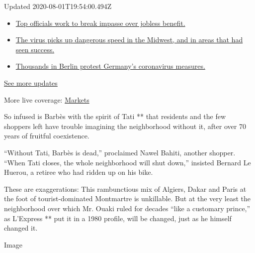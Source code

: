 Updated 2020-08-01T19:54:00.494Z

\begin{itemize}
\tightlist
\item
  \href{https://www.nytimes3xbfgragh.onion/2020/08/01/world/coronavirus-covid-19.html?action=click\&pgtype=Article\&state=default\&region=MAIN_CONTENT_1\&context=storylines_live_updates\#link-3ac56579}{Top
  officials work to break impasse over jobless benefit.}
\item
  \href{https://www.nytimes3xbfgragh.onion/2020/08/01/world/coronavirus-covid-19.html?action=click\&pgtype=Article\&state=default\&region=MAIN_CONTENT_1\&context=storylines_live_updates\#link-8796723}{The
  virus picks up dangerous speed in the Midwest, and in areas that had
  seen success.}
\item
  \href{https://www.nytimes3xbfgragh.onion/2020/08/01/world/coronavirus-covid-19.html?action=click\&pgtype=Article\&state=default\&region=MAIN_CONTENT_1\&context=storylines_live_updates\#link-25930521}{Thousands
  in Berlin protest Germany's coronavirus measures.}
\end{itemize}

\href{https://www.nytimes3xbfgragh.onion/2020/08/01/world/coronavirus-covid-19.html?action=click\&pgtype=Article\&state=default\&region=MAIN_CONTENT_1\&context=storylines_live_updates}{See
more updates}

More live coverage:
\href{https://www.nytimes3xbfgragh.onion/live/2020/07/31/business/stock-market-today-coronavirus?action=click\&pgtype=Article\&state=default\&region=MAIN_CONTENT_1\&context=storylines_live_updates}{Markets}

So infused is Barbès with the spirit of Tati ** that residents and the
few shoppers left have trouble imagining the neighborhood without it,
after over 70 years of fruitful coexistence.

``Without Tati, Barbès is dead,'' proclaimed Nawel Bahiti, another
shopper. ``When Tati closes, the whole neighborhood will shut down,''
insisted Bernard Le Huerou, a retiree who had ridden up on his bike.

These are exaggerations: This rambunctious mix of Algiers, Dakar and
Paris at the foot of tourist-dominated Montmartre is unkillable. But at
the very least the neighborhood over which Mr. Ouaki ruled for decades
``like a customary prince,'' as L'Express ** put it in a 1980 profile,
will be changed, just as he himself changed it.

Image

